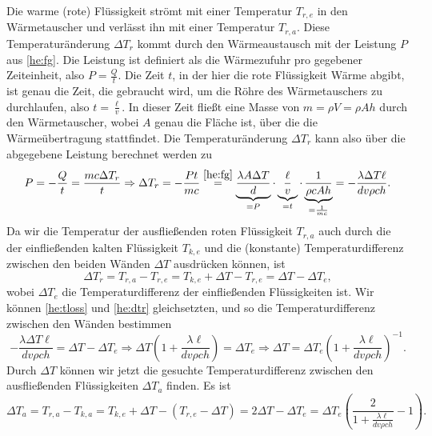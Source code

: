\begin{Answer}[ref= heate]
	Die warme (rote) Flüssigkeit strömt mit einer Temperatur $T_{r,e}$ in den Wärmetauscher und verlässt ihn mit einer Temperatur $T_{r,a}$. Diese Temperaturänderung  $\Delta T_r$ kommt durch den Wärmeaustausch mit der Leistung $P$ aus \eqref{he:fg}. 
	Die Leistung ist definiert als die Wärmezufuhr pro gegebener Zeiteinheit, also $P = \frac{Q}{t}$. Die Zeit $t$, in der hier die rote Flüssigkeit Wärme abgibt, ist genau die Zeit, die gebraucht wird, um die Röhre des Wärmetauschers zu durchlaufen, also $ t = \frac{\ell}{v}$. In dieser Zeit fließt eine Masse von $m = \rho V = \rho A h$ durch den Wärmetauscher, wobei $A$ genau die Fläche ist, über die die Wärmeübertragung stattfindet. Die Temperaturänderung $\Delta T_r$ kann also über die abgegebene Leistung berechnet werden zu
	\begin{equation}\label{he:tloss}
		P = -\frac{Q}{t} = \frac{m c \Delta T_r}{t} \Rightarrow \Delta T_r =- \frac{Pt}{mc} \overset{\eqref{he:fg}}{=} \underbrace{\frac{\lambda A \Delta T }{d}}_{=P}\cdot \underbrace{\frac{\ell}{v}}_{= t}\cdot \underbrace{\frac{1}{\rho c A h}}_{=\frac{1}{mc}} = -\frac{\lambda \Delta T\ell}{dv\rho c h}.
	\end{equation}
	Da wir die Temperatur der ausfließenden roten Flüssigkeit $T_{r,a}$ auch durch die der einfließenden kalten Flüssigkeit $T_{k,e}$ und die (konstante) Temperaturdifferenz zwischen den beiden Wänden $\Delta T$ ausdrücken können, ist
	\begin{equation}\label{he:dtr}
		\Delta T_{r} = T_{r,a} - T_{r,e} = T_{k,e}+\Delta T - T_{r,e} = \Delta T - \Delta T_e,
	\end{equation}
	wobei $\Delta T_e$ die Temperaturdifferenz der einfließenden Flüssigkeiten ist. 
	Wir können \eqref{he:tloss} und \eqref{he:dtr} gleichsetzten, und so die Temperaturdifferenz zwischen den Wänden bestimmen
	\begin{equation}\label{he:tdiffwall}
	-\frac{\lambda \Delta T\ell}{dv\rho c h} = \Delta T - \Delta T_e \Rightarrow \Delta T \left(1+\frac{\lambda \ell}{dv\rho c h}\right) = \Delta T_e\Rightarrow \Delta T = \Delta T_e \left(1+\frac{\lambda \ell}{dv\rho c h}\right)^{-1}.
	\end{equation}
	Durch $\Delta T$ können wir jetzt die gesuchte Temperaturdifferenz zwischen den ausfließenden Flüssigkeiten $\Delta T_a$ finden. Es ist 
	\begin{equation}
	\boxed{
		\Delta T_a = T_{r,a} - T_{k,a} = T_{k,e} + \Delta T - \left(T_{r,e}-\Delta T\right) = 2\Delta T - \Delta T_{e} =\Delta T_e\left( \frac{2}{1+\frac{\lambda \ell}{dv\rho c h}}-1\right).}
	\end{equation}
\end{Answer}